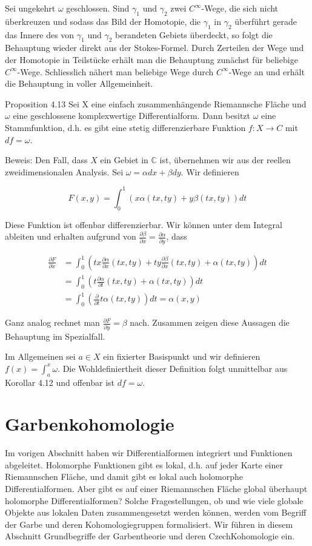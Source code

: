 \documentclass[10pt, letterpaper]{article}
\begin{document}
Sei ungekehrt $\omega$ geschlossen. Sind $\gamma_{1}$ und $\gamma_{2}$ zwei $C^{\infty}$-Wege, die sich nicht überkreuzen und sodass das Bild der Homotopie, die $\gamma_{1}$ in $\gamma_{2}$ überführt gerade das Innere des von $\gamma_{1}$ und $\gamma_{2}$ berandeten Gebiets überdeckt, so folgt die Behauptung wieder direkt aus der Stokes-Formel. Durch Zerteilen der Wege und der Homotopie in Teilstücke erhält man die Behauptung zunächst für beliebige $C^{\infty}$-Wege. Schliesslich nähert man beliebige Wege durch $C^{\infty}$-Wege an und erhält die Behauptung in voller Allgemeinheit.

Proposition 4.13 Sei X eine einfach zusammenhängende Riemannsche Fläche und $\omega$ eine geschlossene komplexwertige Differentialform. Dann besitzt $\omega$ eine Stammfunktion, d.h. es gibt eine stetig differenzierbare Funktion $f: X \rightarrow C$ mit $d f=\omega$.

Beweis: Den Fall, dass $X$ ein Gebiet in $\mathbb{C}$ ist, übernehmen wir aus der reellen zweidimensionalen Analysis. Sei $\omega=\alpha d x+\beta d y$. Wir definieren

$$
F(x, y)=\int_{0}^{1}(x \alpha(t x, t y)+y \beta(t x, t y)) d t
$$

Diese Funktion ist offenbar differenzierbar. Wir können unter dem Integral ableiten und erhalten aufgrund von $\frac{\partial \beta}{\partial x}=\frac{\partial \alpha}{\partial y}$, dass

$$
\begin{aligned}
\frac{\partial F}{\partial x} & =\int_{0}^{1}\left(t x \frac{\partial \alpha}{\partial x}(t x, t y)+t y \frac{\partial \beta}{\partial x}(t x, t y)+\alpha(t x, t y)\right) d t \\
& =\int_{0}^{1}\left(t \frac{\partial \alpha}{\partial t}(t x, t y)+\alpha(t x, t y)\right) d t \\
& =\int_{0}^{1}\left(\frac{\partial}{\partial t} t \alpha(t x, t y)\right) d t=\alpha(x, y)
\end{aligned}
$$

Ganz analog rechnet man $\frac{\partial F}{\partial y}=\beta$ nach. Zusammen zeigen diese Aussagen die Behauptung im Spezialfall.

Im Allgemeinen sei $a \in X$ ein fixierter Basispunkt und wir definieren $f(x)=\int_{a}^{x} \omega$. Die Wohldefiniertheit dieser Definition folgt unmittelbar aus Korollar 4.12 und offenbar ist $d f=\omega$.

\section {Garbenkohomologie}
Im vorigen Abschnitt haben wir Differentialformen integriert und Funktionen abgeleitet. Holomorphe Funktionen gibt es lokal, d.h. auf jeder Karte einer Riemannschen Fläche, und damit gibt es lokal auch holomorphe Differentialformen. Aber gibt es auf einer Riemannschen Fläche global überhaupt holomorphe Differentialformen? Solche Fragestellungen, ob und wie viele globale Objekte aus lokalen Daten zusammengesetzt werden können, werden vom Begriff der Garbe und deren Kohomologiegruppen formalisiert. Wir führen in diesem Abschnitt Grundbegriffe der Garbentheorie und deren CzechKohomologie ein.
\end{document}
